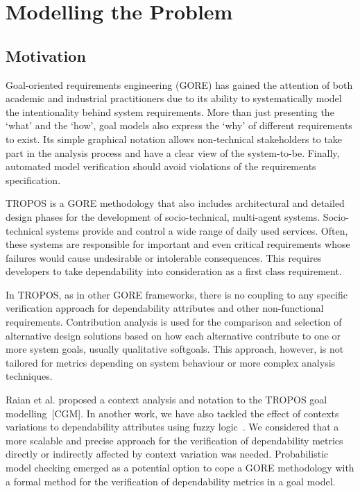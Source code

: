 \chapter{Modelling the Problem}\label{ch:motivation}

\section{Motivation}


Goal-oriented requirements engineering (GORE) has gained the attention of both academic and industrial practitioners due to its ability to systematically model the intentionality behind system requirements. More than just presenting the `what' and the `how', goal models also express the `why' of different requirements to exist. Its simple graphical notation allows non-technical stakeholders to take part in the analysis process and have a clear view of the system-to-be. Finally, automated model verification should avoid violations of the requirements specification.

TROPOS is a GORE methodology that also includes architectural and  detailed design phases for the development of socio-technical, multi-agent systems. Socio-technical systems provide and control a wide range of daily used services. Often, these systems are responsible for important and even critical requirements whose failures would cause undesirable or intolerable consequences. This requires developers to take dependability into consideration as a first class requirement.

In TROPOS, as in other GORE frameworks, there is no coupling to any specific verification approach for dependability attributes and other non-functional requirements. Contribution analysis is used for the comparison and selection of alternative design solutions based on how each alternative contribute to one or more system goals, usually qualitative softgoals. This approach, however, is not tailored for metrics depending on system behaviour or more complex analysis techniques.

Raian et al. proposed a context analysis and notation to the TROPOS goal modelling~[CGM]. In another work, we have also tackled the effect of contexts variations to dependability attributes using fuzzy logic~\cite{Mendonca:2014}. We considered that a more scalable and precise approach for the verification of dependability metrics directly or indirectly affected by context variation was needed. Probabilistic model checking emerged as a potential option to cope a GORE methodology with a formal method for the verification of dependability metrics in a goal model.


